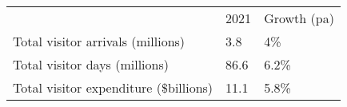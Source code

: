 \begin{tabular}[t]{p{4.7cm}>{\hfill}p{1.1cm}>{\hfill}p{1.7cm}}
   & 2021 & Growth (pa) \\ 
 Total visitor arrivals (millions) & 3.8 & 4\% \\ 
  Total visitor days (millions) & 86.6 & 6.2\% \\ 
  Total visitor expenditure (\$billions) & 11.1 & 5.8\% \\ 
  \end{tabular}
